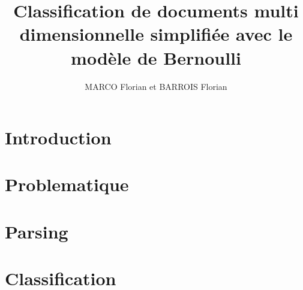 \documentclass[a4paper,11pt]{article}
\title{Classification de documents multi dimensionnelle simplifiée avec le modèle de Bernoulli}
\author{MARCO Florian et BARROIS Florian}
\date{}
\begin{document}
\maketitle

\section{Introduction}

\section{Problematique}

\section{Parsing}

\section{Classification}
\end{document}
